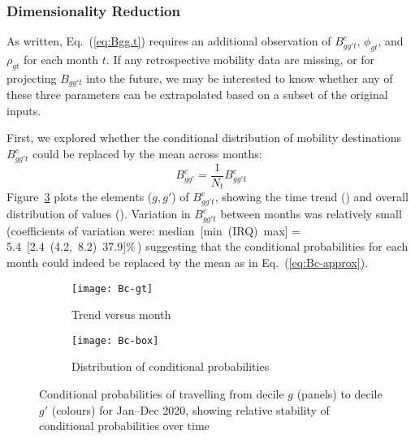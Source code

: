 \subsubsection{Dimensionality Reduction}\label{app.mob.reduce}
As written, Eq.~(\ref{eq:Bgg.t}) requires an additional observation of
$B^c_{gg't}$, $\phi_{gt}$, and $\rho_{gt}$ for each month $t$.
If any retrospective mobility data are missing,
or for projecting $B_{gg't}$ into the future,
we may be interested to know whether any of these three parameters
can be extrapolated based on a subset of the original inputs.
\par
First, we explored whether
the conditional distribution of mobility destinations $B^c_{gg't}$
could be replaced by the mean across months:
\begin{equation}\label{eq:Bc-approx}
  B^c_{gg'} = \frac{1}{N_t} B^c_{gg't}
\end{equation}
Figure~\ref{fig:Bc} plots the elements ($g,g'$) of $B^c_{gg't}$,
showing the time trend ()
and overall distribution of values ().
Variation in $B^c_{gg't}$ between months was relatively small
(coefficients of variation were:
median~[min~(IRQ)~max] = 5.4~[2.4~(4.2,~8.2)~37.9]\%\,)
suggesting that the conditional probabilities for each month
could indeed be replaced by the mean as in Eq.~(\ref{eq:Bc-approx}).
\begin{figure}[bt]
  \begin{subfigure}{\linewidth}
    \texttt{[image: Bc-gt]}
    \caption{Trend versus month}
    \label{fig:Bc-gt}
  \end{subfigure}
  \begin{subfigure}{\linewidth}
    \texttt{[image: Bc-box]}
    \caption{Distribution of conditional probabilities}
    \label{fig:Bc-box}
  \end{subfigure}
  \caption{Conditional probabilities of
    travelling from decile $g$ (panels) to decile $g'$ (colours) for Jan--Dec 2020,
    showing relative stability of conditional probabilities over time}
  \label{fig:Bc}
\end{figure}
